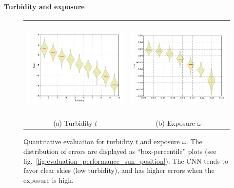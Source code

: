 \paragraph{Turbidity and exposure}

\begin{figure}[!th]
    \centering
    \footnotesize
    \setlength{\tabcolsep}{1pt}
    \begin{tabular}{cc}
    \includegraphics[height=5cm]{figures/evaluation_performances/dist-turdibity.pdf} &
    \includegraphics[height=5cm]{./figures/evaluation_performances/dist-omega.pdf} \\
    (a) Turbidity $t$ &
    (b) Exposure $\omega$ 
    \end{tabular}
    \vspace{.25em}
    \caption{Quantitative evaluation for turbidity $t$ and exposure $\omega$. The distribution of errors are displayed as ``box-percentile'' plots (see fig.~\ref{fig:evaluation_performance_sun_position}). The CNN tends to favor clear skies (low turbidity), and has higher errors when the exposure is high.}
    \label{fig:evaluation_sky_parameters}
\end{figure}

